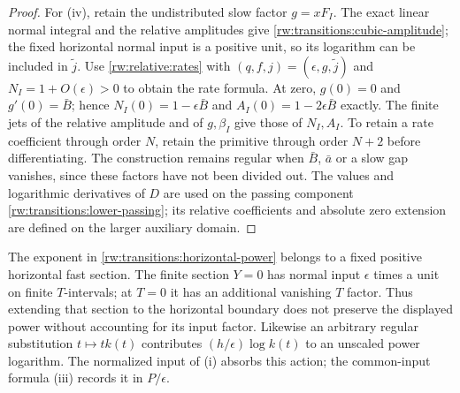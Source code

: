 \begin{proof}
For (iv), retain the undistributed slow factor $g=xF_I$.
The exact linear normal integral and the relative amplitudes give
\eqref{rw:transitions:cubic-amplitude}; the fixed horizontal normal
input is a positive unit, so its logarithm can be included in
$\widetilde j$. Use \eqref{rw:relative:rates} with
$(q,f,j)=(\epsilon,g,\widetilde j)$ and
$N_I=1+O(\epsilon)>0$ to obtain the rate formula.
At zero, $g(0)=0$ and $g'(0)=\bar B$; hence
$N_I(0)=1-\epsilon\bar B$ and
$A_I(0)=1-2\epsilon\bar B$ exactly. The finite jets of the
relative amplitude and of $g,\beta_I$ give those of $N_I,A_I$.
To retain a rate coefficient through order $N$, retain the primitive
through order $N+2$ before differentiating.  The construction remains
regular when $\bar B$, $\bar a$ or a slow gap vanishes, since these
factors have not been divided out.  The values and logarithmic
derivatives of $D$ are used on the passing component
\eqref{rw:transitions:lower-passing}; its relative coefficients and
absolute zero extension are defined on the larger auxiliary domain.
\end{proof}

\begin{remark}
The exponent in \eqref{rw:transitions:horizontal-power} belongs to a
fixed positive horizontal fast section. The finite section $Y=0$ has
normal input $\epsilon$ times a unit on finite $T$-intervals; at
$T=0$ it has an additional vanishing $T$ factor. Thus extending that
section to the horizontal boundary does not preserve the displayed
power without accounting for its input factor. Likewise an arbitrary
regular substitution $t\mapsto tk(t)$ contributes
$(h/\epsilon)\log k(t)$ to an unscaled power logarithm.
The normalized input of (i) absorbs this action; the common-input
formula (iii) records it in $P/\epsilon$.
\end{remark}
